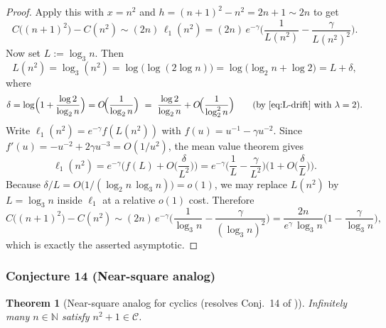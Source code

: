 \documentclass[12pt]{article}
\newtheorem{theorem}{Theorem}
\theoremstyle{remark}
\begin{document}
\begin{proof}
Apply this with $x=n^2$ and $h=(n+1)^2-n^2=2n+1\sim 2n$ to get
\[
 C\big((n+1)^2\big)-C(n^2)\sim (2n)\,\ell_1(n^2)
 =(2n)\,e^{-\gamma}\Big(\frac{1}{L(n^2)}-\frac{\gamma}{L(n^2)^2}\Big).
\]
Now set $L:=\log_3 n$. Then
\[
 L(n^2)=\log_3(n^2)=\log\bigl(\log(2\log n)\bigr)=\log\bigl(\log_2 n+\log 2\bigr)
 = L + \delta,
\]
where
\[
 \delta=\log\Bigl(1+\frac{\log 2}{\log_2 n}\Bigr)=O\!\Big(\frac{1}{\log_2 n}\Big)
 \ =\ \frac{\log 2}{\log_2 n}+O\!\Big(\frac{1}{\log_2^2 n}\Big)\qquad\text{(by \eqref{eq:L-drift} with $\lambda=2$).}
\]
Write $\ell_1(n^2)=e^{-\gamma}f(L(n^2))$ with $f(u)=u^{-1}-\gamma u^{-2}$. Since $f'(u)=-u^{-2}+2\gamma u^{-3}=O(1/u^2)$, the mean value theorem gives
\[
 \ell_1(n^2)=e^{-\gamma}\Big(f(L)+O\Big(\frac{\delta}{L^2}\Big)\Big)
 =e^{-\gamma}\Big(\frac{1}{L}-\frac{\gamma}{L^2}\Big)\Big(1+O\Big(\frac{\delta}{L}\Big)\Big).
\]
Because $\delta/L=O\big(1/(\log_2 n\,\log_3 n)\big)=o(1)$, we may replace $L(n^2)$ by $L=\log_3 n$ inside $\ell_1$ at a relative $o(1)$ cost. Therefore
\[
 C\big((n+1)^2\big)-C(n^2)
 \sim (2n)\,e^{-\gamma}\Big(\frac{1}{\log_3 n}-\frac{\gamma}{(\log_3 n)^2}\Big)
 =\frac{2n}{e^{\gamma}\,\log_3 n}\Big(1-\frac{\gamma}{\log_3 n}\Big),
\]
which is exactly the asserted asymptotic.
\end{proof}


\subsubsection{Conjecture 14 (Near-square analog)}
\begin{theorem}[Near-square analog for cyclics (resolves Conj.~14 of \cite{Cohen2025})]\label{thm:near_square_cyclics}
Infinitely many \(n\in\mathbb{N}\) satisfy \(n^2+1\in\mathcal{C}\).
\end{theorem}
\end{document}
